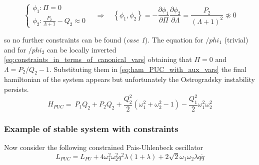 \begin{equation*}
  \begin{cases}
    \phi_1: \Pi = 0 \\
    \phi_2: \frac{P_2}{\Lambda + 1} - Q_2 \approx 0
  \end{cases}
  \quad \Rightarrow \quad
  \left\{ \phi_1, \phi_2 \right\} = -
  \frac{\partial\phi_1}{\partial\Pi} \frac{\partial\phi_2}{\partial\Lambda} =
  \frac{P_2}{(\Lambda + 1)^2} \napprox 0
\end{equation*}

so no further constraints can be found (\emph{case 1}). The equation for
$/phi_1$ (trivial) and for $/phi_2$ can be locally inverted
\eqref{eq:constraints_in_terms_of_canonical_vars} obtaining that $\Pi = 0$ and
$\Lambda = P_2/Q_2 - 1$. Substituting them in \eqref{eq:ham_PUC_with_aux_vars}
the final hamiltonian of the system appears but unfortunately the Ostrogradsky
instability persists.
\begin{equation} \label{eq:ham_PUC_instable}
   H_{PUC} =\ P_1 Q_2 + P_2 Q_2
  + \frac{Q_2^2}{2} \left(\omega_1^2 + \omega_2^2 - 1 \right)
  - \frac{Q_1^2}{2} \omega_1^2 \omega_2^2
\end{equation}


\subsubsection{Example of stable system with constraints}
Now consider the following constrained Pais-Uhlenbeck oscillator \cite{Chen13}
\begin{equation}
  L_{PUC} = L_{PU} +
  4 \omega_1^2\omega_2^2 q^2 \lambda (1+ \lambda) +
  2 \sqrt{2} \omega_1\omega_2 \lambda q \ddot{q}
\end{equation}

